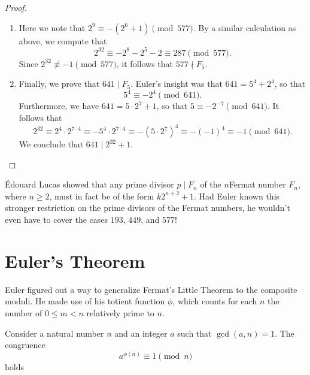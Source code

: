 \begin{proof}
\begin{enumerate}
\begin{align*}
      & \equiv 2(2^6-1)-2^7-2^4 \\
      & \equiv -2^4-2\pmod{449}.
    \end{align*}
    It follows that $2^{32}\equiv (-2^4-2)^2\equiv 2^8+2^6+2^2\equiv 324\pmod{449}$, so we see that $2^{32}\nequiv-1\pmod{449}$.
  \item Here we note that $2^9\equiv -(2^6+1)\pmod{577}$. By a similar calculation as above, we compute that
    \begin{equation*}
      2^{32}\equiv -2^8-2^5-2\equiv 287\pmod{577}.
    \end{equation*}
    Since $2^{32}\nequiv-1\pmod{577}$, it follows that $577\nmid F_5$.
  \item Finally, we prove that $641\mid F_5$. Euler's insight was that $641=5^4+2^4$, so that
    \begin{equation*}
      5^4\equiv -2^4\pmod{641}.
    \end{equation*}
    Furthermore, we have $641=5\cdot 2^7+1$, so that $5\equiv -2^{-7}\pmod{641}$. It follows that
    \begin{equation*}
      2^{32}\equiv 2^4\cdot 2^{7\cdot 4}\equiv -5^4\cdot 2^{7\cdot 4}\equiv -(5\cdot 2^7)^4\equiv - (-1)^4\equiv -1 \pmod{641}.
    \end{equation*}
    We conclude that $641\mid 2^{32}+1$.\qedhere
  \end{enumerate}
\end{proof}

\begin{remark}
  \'Edouard Lucas showed that any prime divisor $p\mid F_n$ of the $n$\supth Fermat number $F_n$, where $n\geq 2$, must in fact be of the form $k2^{n+2}+1$. Had Euler known this stronger restriction on the prime divisors of the Fermat numbers, he wouldn't even have to cover the cases $193$, $449$, and $577$!
\end{remark}

\section{Euler's Theorem}

Euler figured out a way to generalize Fermat's Little Theorem to the composite moduli. He made use of his totient function $\phi$, which counts for each $n$ the number of $0\leq m<n$ relatively prime to $n$.

\begin{theorem}\label{theorem:eulers-theorem}
  Consider a natural number $n$ and an integer $a$ such that $\gcd(a,n)=1$. The congruence
  \begin{equation*}
    a^{\phi(n)}\equiv 1\pmod{n}
  \end{equation*}
  holds
\end{theorem}

